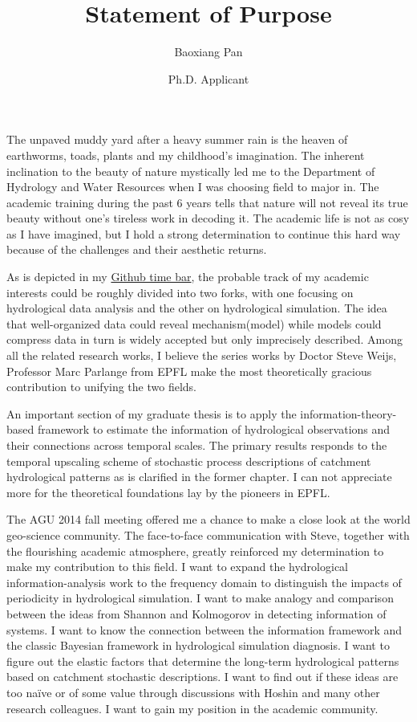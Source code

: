 \documentclass{article}
\title{Statement of Purpose}
\author{Baoxiang Pan}
\date{Ph.D. Applicant}
\begin{document}
  \maketitle%
\large{
  The unpaved muddy yard after a heavy summer rain is the heaven of earthworms, toads, plants and my childhood’s imagination. The inherent inclination to the beauty of nature mystically led me to the Department of Hydrology and Water Resources when I was choosing field to major in. The academic training during the past 6 years tells that nature will not reveal its true beauty without one's tireless work in decoding it.   The academic life is not as cosy  as I have imagined, but I hold a strong determination to continue this hard way because of the challenges and their aesthetic returns. 
 
As is depicted in my {\href{https://github.com/morepenn}{Github time bar}}, the probable track of my academic interests  could be roughly divided into two forks, with one focusing on hydrological data analysis and the other on hydrological simulation. The idea that well-organized data could reveal mechanism(model)  while  models could compress data in turn is widely accepted but only imprecisely described. Among all the related research works, I believe the series works by Doctor Steve Weijs, Professor Marc Parlange from EPFL make the most theoretically gracious contribution to unifying the two fields.

An important section of my graduate thesis is to apply the information-theory-based framework  to estimate the information of hydrological observations and their connections across temporal scales. The primary results responds to the temporal upscaling scheme of stochastic process descriptions of catchment hydrological patterns as is clarified in the former chapter. I can not appreciate more for the theoretical foundations lay by the pioneers in EPFL.

The AGU 2014 fall meeting offered me a chance to make a close look at the world geo-science community. The face-to-face communication with Steve, together with the 
flourishing academic atmosphere, greatly reinforced my determination to make my contribution to this field. I want to expand the hydrological information-analysis work to the frequency domain to distinguish the impacts of periodicity   in hydrological simulation. I want to make analogy and comparison between the ideas from Shannon and Kolmogorov in detecting information of systems. I want to know the connection between the information framework and the classic Bayesian framework in hydrological simulation diagnosis. I want to figure out the elastic factors that determine the long-term hydrological patterns based on catchment stochastic descriptions. I want to find out  if these ideas are too naïve or of some value through discussions with Hoshin and many other research colleagues. I want to  gain my position in the academic community. 

}
\end{document}

